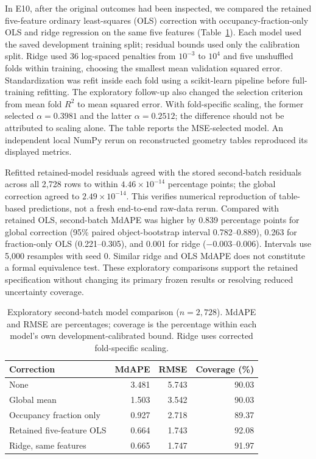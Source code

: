 \documentclass[journal]{IEEEtran}
\begin{document}
In E10, after the original outcomes had been inspected, we compared the retained five-feature ordinary least-squares (OLS) correction with occupancy-fraction-only OLS and ridge regression on the same five features (Table~\ref{tab:model_sensitivity}). Each model used the saved development training split; residual bounds used only the calibration split. Ridge used 36 log-spaced penalties from $10^{-3}$ to $10^4$ and five unshuffled folds within training, choosing the smallest mean validation squared error. Standardization was refit inside each fold using a scikit-learn pipeline before full-training refitting. The exploratory follow-up also changed the selection criterion from mean fold $R^2$ to mean squared error. With fold-specific scaling, the former selected $\alpha=0.3981$ and the latter $\alpha=0.2512$; the difference should not be attributed to scaling alone. The table reports the MSE-selected model. An independent local NumPy rerun on reconstructed geometry tables reproduced its displayed metrics.

Refitted retained-model residuals agreed with the stored second-batch residuals across all 2,728 rows to within $4.46\times10^{-14}$ percentage points; the global correction agreed to $2.49\times10^{-14}$. This verifies numerical reproduction of table-based predictions, not a fresh end-to-end raw-data rerun. Compared with retained OLS, second-batch MdAPE was higher by 0.839 percentage points for global correction (95\% paired object-bootstrap interval 0.782--0.889), 0.263 for fraction-only OLS (0.221--0.305), and 0.001 for ridge ($-0.003$--0.006). Intervals use 5,000 resamples with seed 0. Similar ridge and OLS MdAPE does not constitute a formal equivalence test. These exploratory comparisons support the retained specification without changing its primary frozen results or resolving reduced uncertainty coverage.

\begin{table}[t]
\centering
\caption{Exploratory second-batch model comparison ($n=2{,}728$). MdAPE and RMSE are percentages; coverage is the percentage within each model's own development-calibrated bound. Ridge uses corrected fold-specific scaling.}
\label{tab:model_sensitivity}
\begin{tabular}{lrrr}
\toprule
Correction & MdAPE & RMSE & Coverage (\%) \\
\midrule
None & 3.481 & 5.743 & 90.03 \\
Global mean & 1.503 & 3.542 & 90.03 \\
Occupancy fraction only & 0.927 & 2.718 & 89.37 \\
Retained five-feature OLS & 0.664 & 1.743 & 92.08 \\
Ridge, same features & 0.665 & 1.747 & 91.97 \\
\bottomrule
\end{tabular}
\end{table}
\end{document}

